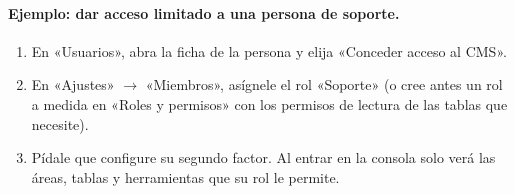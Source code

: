 \paragraph{Ejemplo: dar acceso limitado a una persona de soporte.}
\begin{enumerate}
  \item En «Usuarios», abra la ficha de la persona y elija «Conceder acceso al
        CMS».
  \item En «Ajustes» $\rightarrow$ «Miembros», asígnele el rol «Soporte» (o
        cree antes un rol a medida en «Roles y permisos» con los permisos de
        lectura de las tablas que necesite).
  \item Pídale que configure su segundo factor. Al entrar en la consola solo
        verá las áreas, tablas y herramientas que su rol le permite.
\end{enumerate}
